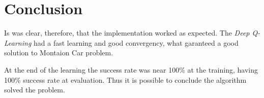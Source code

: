\documentclass[journal]{IEEEtran}
\begin{document}
\section {Conclusion}

Is was clear, therefore, that the implementation worked as expected. The \textit{Deep Q-Learning} had a fast learning and good convergency, what garanteed a good solution to Montaion Car problem.

At the end of the learning the success rate was near 100\% at the training, having 100\% success rate at evaluation. Thus it is possible to conclude the algorithm solved the problem.

\vfill
\end{document}

